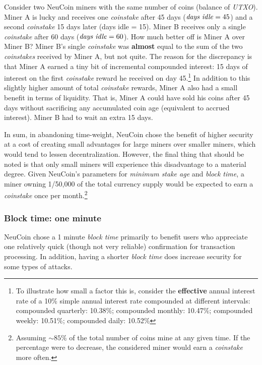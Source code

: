 \documentclass[a4paper,11pt]{article}
\begin{document}
Consider two NeuCoin miners with the same number of coins (balance of \textit{UTXO}). Miner A is lucky and receives one \textit{coinstake} after 45 days ($\text{\textit{days idle}} = 45$) and a second \textit{coinstake} 15 days later (days idle = 15). Miner B receives only a single \textit{coinstake} after 60 days ($\text{\textit{days idle}} = 60$). How much better off is Miner A over Miner B? Miner B's single \textit{coinstake} was \textbf{almost} equal to the sum of the two \textit{coinstakes} received by Miner A, but not quite. The reason for the discrepancy is that Miner A earned a tiny bit of incremental compounded interest: 15 days of interest on the first \textit{coinstake} reward he received on day 45.\footnote{To illustrate how small a factor this is, consider the \textbf{effective} annual interest rate of a 10\% simple annual interest rate compounded at different intervals: compounded quarterly: 10.38\%; compounded monthly: 10.47\%; compounded weekly: 10.51\%; compounded daily: 10.52\%} In addition to this slightly higher amount of total \textit{coinstake} rewards, Miner A also had a small benefit in terms of liquidity. That is, Miner A could have sold his coins after 45 days without sacrificing any accumulated coin age (equivalent to accrued interest). Miner B had to wait an extra 15 days.

In sum, in abandoning time-weight, NeuCoin chose the benefit of higher security at a cost of creating small advantages for large miners over smaller miners, which would tend to lessen decentralization. However, the final thing that should be noted is that only small miners will experience this disadvantage to a material degree. Given NeuCoin's parameters for \textit{minimum stake age} and \textit{block time}, a miner owning 1/50,000 of the total currency supply would be expected to earn a \textit{coinstake} once per month.\footnote{Assuming $\sim85\%$ of the total number of coins mine at any given time. If the percentage were to decrease, the considered miner would earn a \textit{coinstake} more often. }


\subsubsection*{Block time: one minute}

NeuCoin chose a 1 minute \textit{block time} primarily to benefit users who appreciate one relatively quick (though not very reliable) confirmation for transaction processing. In addition, having a shorter \textit{block time} does increase security for some types of attacks.
\end{document}
